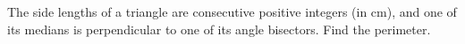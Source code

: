 The side lengths of a triangle are consecutive positive integers (in cm), and one of its medians is perpendicular to one of its angle bisectors. Find the perimeter.
